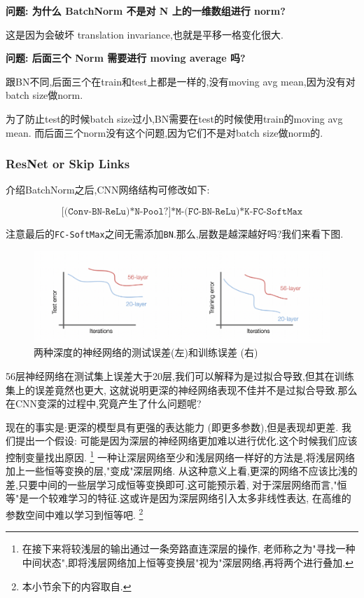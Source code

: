 \textbf{问题: 为什么 BatchNorm 不是对 N 上的一维数组进行 norm?}

这是因为会破坏 translation invariance,也就是平移一格变化很大.

\textbf{问题: 后面三个 Norm 需要进行 moving average 吗?}

跟BN不同,后面三个在train和test上都是一样的,没有moving avg mean,因为没有对batch size做norm.

为了防止test的时候batch size过小,BN需要在test的时候使用train的moving avg mean.
而后面三个norm没有这个问题,因为它们不是对batch size做norm的.

\subsubsection{ResNet or Skip Links}

介绍BatchNorm之后,CNN网络结构可修改如下:

\[\texttt{[(Conv-BN-ReLu)*N-Pool?]*M-(FC-BN-ReLu)*K-FC-SoftMax}\]

注意最后的\texttt{FC-SoftMax}之间无需添加\texttt{BN}.那么,层数是越深越好吗?我们来看下图.
\begin{figure}[htbp]
	\centering
	\includegraphics[scale=0.65]{figures/deep-test-err.png}
	\caption{两种深度的神经网络的测试误差(左)和训练误差 (右)}
	\label{过拟合}
\end{figure}

56层神经网络在测试集上误差大于20层,我们可以解释为是过拟合导致,但其在训练集上的误差竟然也更大,
这就说明更深的神经网络表现不佳并不是过拟合导致.那么在CNN变深的过程中,究竟产生了什么问题呢?

现在的事实是:更深的模型具有更强的表达能力 (即更多参数),但是表现却更差.
我们提出一个假设:
可能是因为深层的神经网络更加难以进行优化.这个时候我们应该控制变量找出原因.
\footnote{在接下来将较浅层的输出通过一条旁路直连深层的操作,
老师称之为"寻找一种中间状态",即将浅层网络加上恒等变换层"视为"深层网络,再将两个进行叠加.}
一种让深层网络至少和浅层网络一样好的方法是,将浅层网络加上一些恒等变换的层,"变成"深层网络.
从这种意义上看,更深的网络不应该比浅的差,只要中间的一些层学习成恒等变换即可.这可能预示着,
对于深层网络而言,"恒等"是一个较难学习的特征.这或许是因为深层网络引入太多非线性表达,
在高维的参数空间中难以学习到恒等吧.
\footnote{本小节余下的内容取自\cite{WhyResNetWorks}.}

